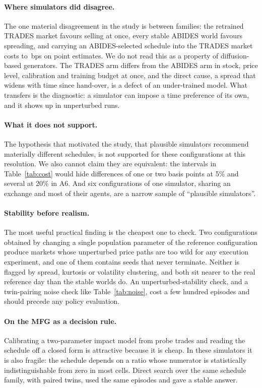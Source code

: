 \paragraph{Where simulators did disagree.} The one material disagreement in the study is between families: the retrained TRADES market favours selling at once, every stable ABIDES world favours spreading, and carrying an ABIDES-selected schedule into the TRADES market costs \abidesToTradesMin{} to \abidesToTradesMax{}\,bps on point estimates. We do not read this as a property of diffusion-based generators. The TRADES arm differs from the ABIDES arm in stock, price level, calibration and training budget at once, and the direct cause, a spread that widens with time since hand-over, is a defect of an under-trained model. What transfers is the diagnostic: a simulator can impose a time preference of its own, and it shows up in unperturbed runs.

\paragraph{What it does not support.} The hypothesis that motivated the study, that plausible simulators recommend materially different schedules, is not supported for these configurations at this resolution. We also cannot claim they are equivalent: the intervals in Table~\ref{tab:cost} would hide differences of one or two basis points at 5\% and several at 20\% in A6. And six configurations of one simulator, sharing an exchange and most of their agents, are a narrow sample of ``plausible simulators''.

\paragraph{Stability before realism.} The most useful practical finding is the cheapest one to check. Two configurations obtained by changing a single population parameter of the reference configuration produce markets whose unperturbed price paths are too wild for any execution experiment, and one of them contains seeds that never terminate. Neither is flagged by spread, kurtosis or volatility clustering, and both sit nearer to the real reference day than the stable worlds do. An unperturbed-stability check, and a twin-pairing noise check like Table~\ref{tab:noise}, cost a few hundred episodes and should precede any policy evaluation.

\paragraph{On the MFG as a decision rule.} Calibrating a two-parameter impact model from probe trades and reading the schedule off a closed form is attractive because it is cheap. In these simulators it is also fragile: the schedule depends on a ratio whose numerator is statistically indistinguishable from zero in most cells. Direct search over the same schedule family, with paired twins, used the same episodes and gave a stable answer.

